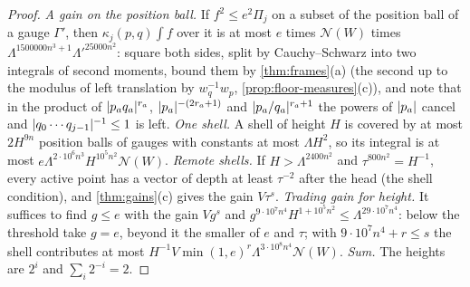 \begin{proof}
\emph{A gain on the position ball.} If $f^2\le e^2\Pi_j$ on a subset of the position ball of a gauge $\Gamma'$, then $\kappa_j(p,q)\int f$ over it is at most $e$ times $\mathcal N(W)$ times $\Lambda^{1500000n^3+1}\Lambda'^{25000n^2}$: square both sides, split by
Cauchy--Schwarz into two integrals of second moments, bound them by \cref{thm:frames}(a) (the second up to the modulus of left translation by $w_q^{-1}w_p$, \cref{prop:floor-measures}(c)), and note that in the product of
$\lvert p_aq_a\rvert^{r_a}$, $\lvert p_a\rvert^{-(2r_a+1)}$ and $\lvert p_a/q_a\rvert^{r_a+1}$ the powers of $\lvert p_a\rvert$ cancel and $\lvert q_0\cdots q_{j-1}\rvert^{-1}\le1$ is left. \emph{One shell.} A shell of height $H$ is covered by at most $2H^{9n}$ position balls of
gauges with constants at most $\Lambda H^2$, so its integral is at most $e\Lambda^{2\cdot10^6n^3}H^{10^5n^2}\mathcal N(W)$. \emph{Remote shells.} If $H>\Lambda^{2400n^2}$ and $\tau^{800n^2}=H^{-1}$, every active point has a vector of depth at least
$\tau^{-2}$ after the head (the shell condition), and \cref{thm:gains}(c) gives the gain $V\tau^s$. \emph{Trading gain for height.} It suffices to find $g\le e$ with the gain $Vg^s$ and $g^{9\cdot10^7n^4}H^{1+10^5n^2}\le\Lambda^{29\cdot10^7n^4}$: below
the threshold take $g=e$, beyond it the smaller of $e$ and $\tau$; with $9\cdot10^7n^4+r\le s$ the shell contributes at most $H^{-1}V\min(1,e)^r\Lambda^{3\cdot10^8n^4}\mathcal N(W)$. \emph{Sum.} The heights are $2^i$ and $\sum_i2^{-i}=2$.
\end{proof}

